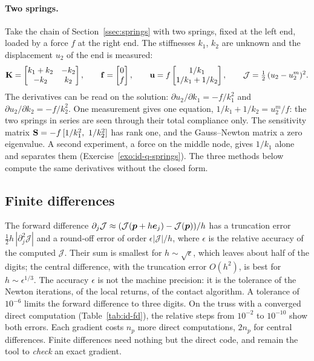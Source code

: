 \paragraph{Two springs.}
%
Take the chain of Section~\ref{ssec:springs} with two springs, fixed at the
left end, loaded by a force $f$ at the right end. The stiffnesses $k_1$, $k_2$
are unknown and the displacement $u_2$ of the end is measured:
\[
  \mathbf{K}=\begin{bmatrix}k_1+k_2&-k_2\\-k_2&k_2\end{bmatrix},\qquad
  \mathbf{f}=\begin{bmatrix}0\\f\end{bmatrix},\qquad
  \mathbf{u}=f\begin{bmatrix}1/k_1\\1/k_1+1/k_2\end{bmatrix},\qquad
  \mathcal J=\tfrac12\,(u_2-u_2^m)^2 .
\]
The derivatives can be read on the solution: $\partial u_2/\partial k_1=-f/k_1^2$
and $\partial u_2/\partial k_2=-f/k_2^2$. One measurement gives one equation,
$1/k_1+1/k_2=u_2^m/f$: the two springs in series are seen through their total
compliance only. The sensitivity matrix $\mat{S}=-f\,[1/k_1^2,\ 1/k_2^2]$ has
rank one, and the Gauss--Newton matrix a zero eigenvalue. A second experiment,
a force on the middle node, gives $1/k_1$ alone and separates them
(Exercise~\ref{exo:id-q-springs}). The three methods below compute the same
derivatives without the closed form.

\subsection{Finite differences}\label{ssec:id-fd}
%
The forward difference
$\partial_j\mathcal J\approx(\mathcal J(\bm{p}+h\bm{e}_j)-\mathcal J(\bm{p}))/h$ has a truncation error
$\tfrac12h\,|\partial^2_j\mathcal J|$ and a round-off error of order $\epsilon|\mathcal J|/h$,
where $\epsilon$ is the relative accuracy of the computed $\mathcal J$. Their sum is
smallest for $h\sim\sqrt{\epsilon}$, which leaves about half of the digits; the
central difference, with the truncation error $O(h^2)$, is best for
$h\sim\epsilon^{1/3}$. The accuracy $\epsilon$ is not the machine precision: it is
the tolerance of the Newton iterations, of the local returns, of the contact
algorithm. A tolerance of $10^{-6}$ limits the forward difference to three
digits. On the truss with a converged direct computation (Table~\ref{tab:id-fd}),
the relative steps from $10^{-2}$ to $10^{-10}$ show both errors. Each gradient
costs $n_p$ more direct computations, $2n_p$ for central differences.
Finite differences need nothing but the direct code, and remain the tool to
\emph{check} an exact gradient.


